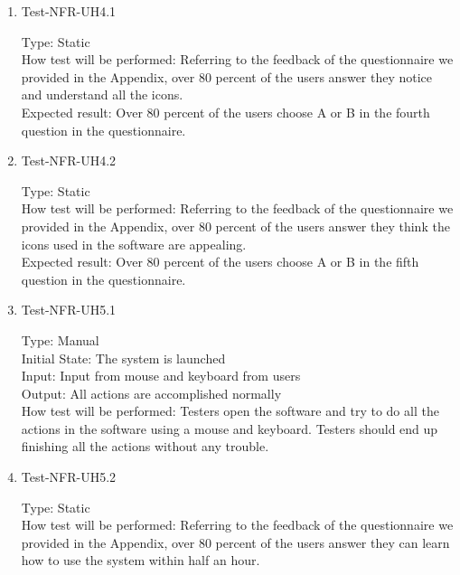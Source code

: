 \documentclass[12pt, titlepage]{article}
\begin{document}
\begin{enumerate}
\item{Test-NFR-UH4.1\\}

Type: Static\\

How test will be performed: Referring to the feedback of the questionnaire we provided in the Appendix, over 80 percent of the users answer they notice and understand all the icons.\\

Expected result: Over 80 percent of the users choose A or B in the fourth question in the questionnaire.

\item{Test-NFR-UH4.2\\}

Type: Static\\

How test will be performed: Referring to the feedback of the questionnaire we provided in the Appendix, over 80 percent of the users answer they think the icons used in the software are appealing.\\

Expected result: Over 80 percent of the users choose A or B in the fifth question in the questionnaire.

\item{Test-NFR-UH5.1\\}

Type: Manual\\

Initial State: The system is launched\\

Input: Input from mouse and keyboard from users\\

Output: All actions are accomplished normally\\

How test will be performed: Testers open the software and try to do all the actions in the software using a mouse and keyboard. Testers should end up finishing all the actions without any trouble.

\item{Test-NFR-UH5.2\\}

Type: Static\\

How test will be performed: Referring to the feedback of the questionnaire we provided in the Appendix, over 80 percent of the users answer they can learn how to use the system within half an hour.\\


\end{enumerate}
\end{document}
